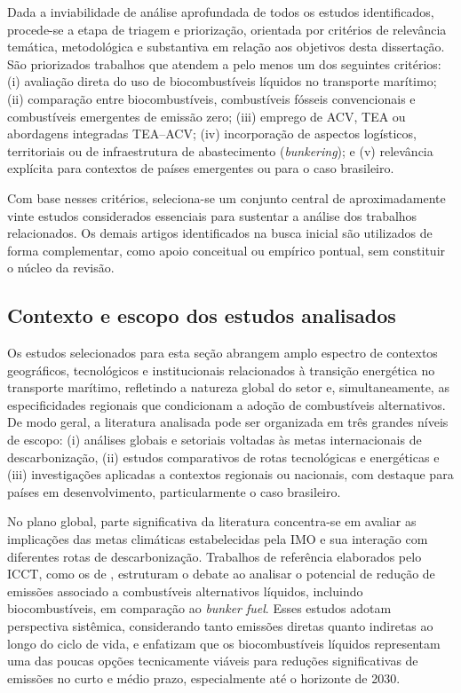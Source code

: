 Dada a inviabilidade de análise aprofundada de todos os estudos identificados, procede-se a etapa de triagem e priorização, orientada por critérios de relevância temática, metodológica e substantiva em relação aos objetivos desta dissertação. São priorizados trabalhos que atendem a pelo menos um dos seguintes critérios: (i) avaliação direta do uso de biocombustíveis líquidos no transporte marítimo; (ii) comparação entre biocombustíveis, combustíveis fósseis convencionais e combustíveis emergentes de emissão zero; (iii) emprego de \gls{ACV}, \gls{TEA} ou abordagens integradas \gls{TEA}--\gls{ACV}; (iv) incorporação de aspectos logísticos, territoriais ou de infraestrutura de abastecimento (\emph{bunkering}); e (v) relevância explícita para contextos de países emergentes ou para o caso brasileiro.

Com base nesses critérios, seleciona-se um conjunto central de aproximadamente vinte estudos considerados essenciais para sustentar a análise dos trabalhos relacionados. Os demais artigos identificados na busca inicial são utilizados de forma complementar, como apoio conceitual ou empírico pontual, sem constituir o núcleo da revisão.

\subsection{Contexto e escopo dos estudos analisados}
Os estudos selecionados para esta seção abrangem amplo espectro de contextos geográficos, tecnológicos e institucionais relacionados à transição energética no transporte marítimo, refletindo a natureza global do setor e, simultaneamente, as especificidades regionais que condicionam a adoção de combustíveis alternativos. De modo geral, a literatura analisada pode ser organizada em três grandes níveis de escopo: (i) análises globais e setoriais voltadas às metas internacionais de descarbonização, (ii) estudos comparativos de rotas tecnológicas e energéticas e (iii) investigações aplicadas a contextos regionais ou nacionais, com destaque para países em desenvolvimento, particularmente o caso brasileiro.

No plano global, parte significativa da literatura concentra-se em avaliar as implicações das metas climáticas estabelecidas pela \gls{IMO} e sua interação com diferentes rotas de descarbonização. Trabalhos de referência elaborados pelo \gls{ICCT}, como os de \citet{international_council_on_clean_transportation_potential_2021}, estruturam o debate ao analisar o potencial de redução de emissões associado a combustíveis alternativos líquidos, incluindo biocombustíveis, em comparação ao \emph{bunker fuel}. Esses estudos adotam perspectiva sistêmica, considerando tanto emissões diretas quanto indiretas ao longo do ciclo de vida, e enfatizam que os biocombustíveis líquidos representam uma das poucas opções tecnicamente viáveis para reduções significativas de emissões no curto e médio prazo, especialmente até o horizonte de 2030.

